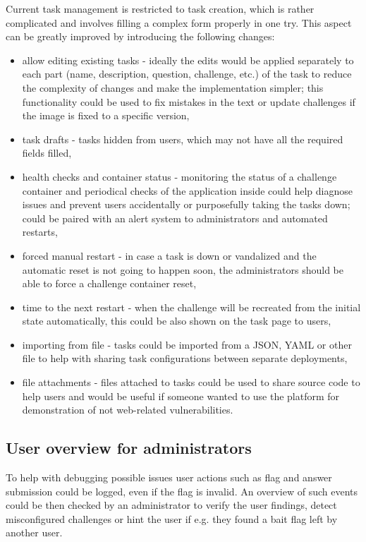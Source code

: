 Current task management is restricted to task creation, which is rather complicated and involves filling a complex form properly in one try. This aspect can be greatly improved by introducing the following changes:
\begin{itemize}
	\item allow editing existing tasks - ideally the edits would be applied separately to each part (name, description, question, challenge, etc.) of the task to reduce the complexity of changes and make the implementation simpler; this functionality could be used to fix mistakes in the text or update challenges if the image is fixed to a specific version,
	\item task drafts - tasks hidden from users, which may not have all the required fields filled,
	\item health checks and container status - monitoring the status of a challenge container and periodical checks of the application inside could help diagnose issues and prevent users accidentally or purposefully taking the tasks down; could be paired with an alert system to administrators and automated restarts,
	\item forced manual restart - in case a task is down or vandalized and the automatic reset is not going to happen soon, the administrators should be able to force a challenge container reset,
	\item time to the next restart - when the challenge will be recreated from the initial state automatically, this could be also shown on the task page to users,
	\item importing from file - tasks could be imported from a JSON, YAML or other file to help with sharing task configurations between separate deployments,
	\item file attachments - files attached to tasks could be used to share source code to help users and would be useful if someone wanted to use the platform for demonstration of not web-related vulnerabilities.
\end{itemize}

\subsection{User overview for administrators}

To help with debugging possible issues user actions such as flag and answer submission could be logged, even if the flag is invalid. An overview of such events could be then checked by an administrator to verify the user findings, detect misconfigured challenges or hint the user if e.g. they found a bait flag left by another user.

